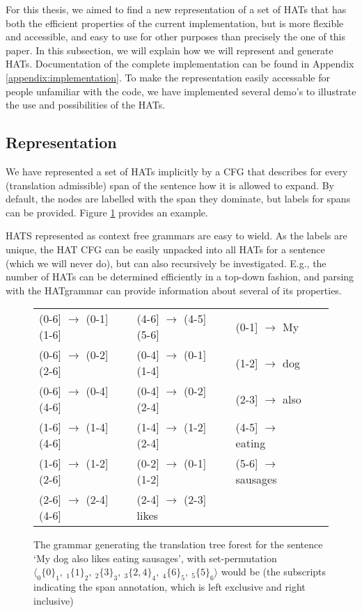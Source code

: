 For this thesis, we aimed to find a new representation of a set of HATs that has both the efficient properties of the current implementation, but is more flexible and accessible, and easy to use for other purposes than precisely the one of this paper. In this subsection, we will explain how we will represent and generate HATs. Documentation of the complete implementation can be found in Appendix \ref{appendix:implementation}. To make the representation easily accessable for people unfamiliar with the code, we have implemented several demo's to illustrate the use and possibilities of the HATs.


\subsection{Representation}

We have represented a set of HATs implicitly by a CFG that describes for every (translation admissible) span of the sentence how it is allowed to expand. By default, the nodes are labelled with the span they dominate, but labels for spans can be provided. Figure \ref{fig:grammar} provides an example.

HATS represented as context free grammars are easy to wield. As the labels are unique, the HAT CFG can be easily unpacked into all HATs for a sentence (which we will never do), but can also recursively be investigated. E.g., the number of HATs can be determined efficiently in a top-down fashion, and parsing with the HATgrammar can provide information about several of its properties.

\begin{figure}\begin{framed}
\small{
\begin{tabular}{llllll}
(0-6] $\rightarrow$ (0-1]  (1-6] && (4-6] $\rightarrow$ (4-5]  (5-6] && (0-1] $\rightarrow$ My\\
(0-6] $\rightarrow$ (0-2]  (2-6] && (0-4] $\rightarrow$ (0-1]  (1-4] && (1-2] $\rightarrow$ dog\\
(0-6] $\rightarrow$ (0-4]  (4-6] && (0-4] $\rightarrow$ (0-2]  (2-4] && (2-3] $\rightarrow$ also\\
(1-6] $\rightarrow$ (1-4]  (4-6] && (1-4] $\rightarrow$ (1-2]  (2-4] && (4-5] $\rightarrow$ eating\\
(1-6] $\rightarrow$ (1-2]  (2-6] && (0-2] $\rightarrow$ (0-1]  (1-2] && (5-6] $\rightarrow$ sausages\\
(2-6] $\rightarrow$ (2-4]  (4-6] && (2-4] $\rightarrow$ (2-3] likes\\
\end{tabular}
\caption{The grammar generating the translation tree forest for the sentence
`My dog also likes eating sausages', with set-permutation $\langle _0\{0\}_1,~ _1\{1\}_2,~ _2\{3\}_3,~ _3\{2,4\}_4, ~_4\{6\}_5,~ _5\{5\}_6\rangle$ would be (the subscripts indicating the span annotation, which is left exclusive and right inclusive)}\label{fig:grammar}
}
\end{framed}
\end{figure}

